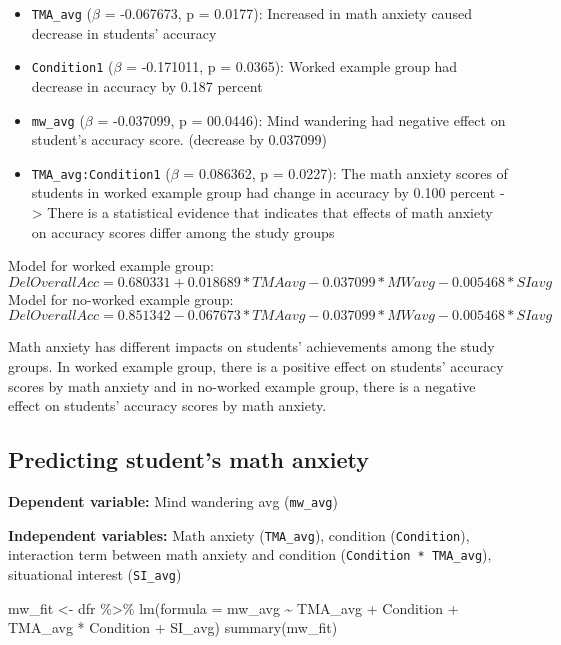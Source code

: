 \documentclass[
]{article}
\newenvironment{Shaded}{\begin{snugshade}}{\end{snugshade}}
\newcommand{\AttributeTok}[1]{\textcolor[rgb]{0.77,0.63,0.00}{#1}}
\newcommand{\FunctionTok}[1]{\textcolor[rgb]{0.00,0.00,0.00}{#1}}
\newcommand{\NormalTok}[1]{#1}
\newcommand{\OtherTok}[1]{\textcolor[rgb]{0.56,0.35,0.01}{#1}}
\newcommand{\SpecialCharTok}[1]{\textcolor[rgb]{0.00,0.00,0.00}{#1}}
\begin{document}
\begin{itemize}
\item
  \texttt{TMA\_avg} (\(\beta\) = -0.067673, p = 0.0177): Increased in
  math anxiety caused decrease in students' accuracy
\item
  \texttt{Condition1} (\(\beta\) = -0.171011, p = 0.0365): Worked
  example group had decrease in accuracy by 0.187 percent
\item
  \texttt{mw\_avg} (\(\beta\) = -0.037099, p = 00.0446): Mind wandering
  had negative effect on student's accuracy score. (decrease by
  0.037099)
\item
  \texttt{TMA\_avg:Condition1} (\(\beta\) = 0.086362, p = 0.0227): The
  math anxiety scores of students in worked example group had change in
  accuracy by 0.100 percent -\textgreater{} There is a statistical
  evidence that indicates that effects of math anxiety on accuracy
  scores differ among the study groups
\end{itemize}

Model for worked example group:
\[DelOverallAcc = 0.680331 + 0.018689 * TMAavg - 0.037099 * MWavg - 0.005468 * SIavg\]
Model for no-worked example group:
\[DelOverallAcc = 0.851342 - 0.067673 * TMAavg- 0.037099 * MWavg - 0.005468 * SIavg\]

Math anxiety has different impacts on students' achievements among the
study groups. In worked example group, there is a positive effect on
students' accuracy scores by math anxiety and in no-worked example
group, there is a negative effect on students' accuracy scores by math
anxiety.

\hypertarget{predicting-students-math-anxiety}{%
\subsection{Predicting student's math
anxiety}\label{predicting-students-math-anxiety}}

\textbf{Dependent variable:} Mind wandering avg (\texttt{mw\_avg})

\textbf{Independent variables:} Math anxiety (\texttt{TMA\_avg}),
condition (\texttt{Condition}), interaction term between math anxiety
and condition (\texttt{Condition\ *\ TMA\_avg}), situational interest
(\texttt{SI\_avg})

\begin{Shaded}
\begin{Highlighting}[]
\NormalTok{mw\_fit }\OtherTok{\textless{}{-}}\NormalTok{ dfr }\SpecialCharTok{\%\textgreater{}\%} 
  \FunctionTok{lm}\NormalTok{(}\AttributeTok{formula =}\NormalTok{ mw\_avg }\SpecialCharTok{\textasciitilde{}}\NormalTok{ TMA\_avg }\SpecialCharTok{+}\NormalTok{ Condition }\SpecialCharTok{+}\NormalTok{ TMA\_avg }\SpecialCharTok{*}\NormalTok{ Condition }\SpecialCharTok{+}\NormalTok{ SI\_avg)}
\FunctionTok{summary}\NormalTok{(mw\_fit)}
\end{Highlighting}
\end{Shaded}
\end{document}
